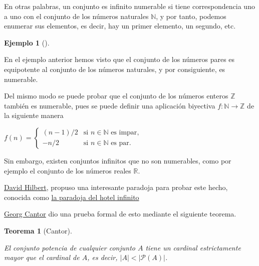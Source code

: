 \documentclass[
  a4paper,
]{scrreport}
\theoremstyle{definition}
\newtheorem{example}{Ejemplo}[chapter]
\theoremstyle{plain}
\theoremstyle{definition}
\theoremstyle{definition}
\theoremstyle{plain}
\newtheorem{theorem}{Teorema}[chapter]
\theoremstyle{plain}
\theoremstyle{remark}
\begin{document}
En otras palabras, un conjunto es infinito numerable si tiene
correspondencia uno a uno con el conjunto de los números naturales
\(\mathbb{N}\), y por tanto, podemos enumerar sus elementos, es decir,
hay un primer elemento, un segundo, etc.

\begin{example}[]\protect\hypertarget{exm-enteros-equipotentes-naturales}{}\label{exm-enteros-equipotentes-naturales}

En el ejemplo anterior hemos visto que el conjunto de los números pares
es equipotente al conjunto de los números naturales, y por consiguiente,
es numerable.

Del mismo modo se puede probar que el conjunto de los números enteros
\(\mathbb{Z}\) también es numerable, pues se puede definir una
aplicación biyectiva \(f:\mathbb{N}\rightarrow \mathbb{Z}\) de la
siguiente manera

\(f(n)=
\begin{cases}
(n-1)/2 &\mbox{si } n\in \mathbb{N} \mbox{ es impar},\\
-n/2 &\mbox{si } n\in \mathbb{N} \mbox{ es par}.
\end{cases}\)

\end{example}

Sin embargo, existen conjuntos infinitos que no son numerables, como por
ejemplo el conjunto de los números reales \(\mathbb{R}\).

\href{https://es.wikipedia.org/wiki/David_Hilbert}{David Hilbert},
propuso una interesante paradoja para probar este hecho, conocida como
\href{https://www.youtube.com/watch?v=4c8vG-mxuao}{la paradoja del hotel
infinito}

\href{https://en.wikipedia.org/wiki/Georg_Cantor}{Georg Cantor} dio una
prueba formal de esto mediante el siguiente teorema.

\begin{theorem}[Cantor]\protect\hypertarget{thm-cantor}{}\label{thm-cantor}

El conjunto potencia de cualquier conjunto \(A\) tiene un cardinal
estrictamente mayor que el cardinal de \(A\), es decir,
\(|A| < |\mathcal{P}(A)|\).

\end{theorem}
\end{document}
